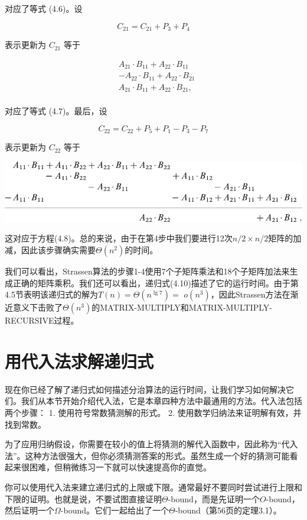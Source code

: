 \documentclass[lang=cn,newtx,10pt,scheme=chinese]{elegantbook}
\begin{document}
对应了等式 (4.6)。设

$$
C_{21}=C_{21}+P_3+P_4
$$

表示更新为 $C_{21}$ 等于

$$
\begin{aligned}
& A_{21} \cdot B_{11}+A_{22} \cdot B_{11} \\
& -A_{22} \cdot B_{11}+A_{22} \cdot B_{21} \\
& A_{21} \cdot B_{11}+A_{22} \cdot B_{21} \text {, } \\
&
\end{aligned}
$$

对应了等式 (4.7)。最后，设

$$
C_{22}=C_{22}+P_5+P_1-P_3-P_7
$$

表示更新为 $C_{22}$ 等于

\includegraphics{算法导论第四版插图/第四章/斯特拉森公式2.pdf}

这对应于方程(4.8)。总的来说，由于在第4步中我们要进行12次$n/2\times n/2$矩阵的加减，因此该步骤确实需要$\Theta\left(n^2\right)$的时间。

我们可以看出，Strassen算法的步骤1-4使用7个子矩阵乘法和18个子矩阵加法来生成正确的矩阵乘积。我们还可以看出，递归式(4.10)描述了它的运行时间。由于第4.5节表明该递归式的解为$T(n)=\Theta\left(n^{\lg 7}\right)=$ $o\left(n^3\right)$，因此Strassen方法在渐近意义下击败了$\Theta\left(n^3\right)$的MATRIX-MULTIPLY和MATRIX-MULTIPLY-RECURSIVE过程。


\section{用代入法求解递归式}

现在你已经了解了递归式如何描述分治算法的运行时间，让我们学习如何解决它们。我们从本节开始介绍代入法，它是本章四种方法中最通用的方法。代入法包括两个步骤：
1. 使用符号常数猜测解的形式。
2. 使用数学归纳法来证明解有效，并找到常数。

为了应用归纳假设，你需要在较小的值上将猜测的解代入函数中，因此称为“代入法”。这种方法很强大，但你必须猜测答案的形式。虽然生成一个好的猜测可能看起来很困难，但稍微练习一下就可以快速提高你的直觉。

你可以使用代入法来建立递归式的上限或下限。通常最好不要同时尝试进行上限和下限的证明。也就是说，不要试图直接证明$\Theta$-bound，而是先证明一个$O$-bound，然后证明一个$\Omega$-bound。它们一起给出了一个$\Theta$-bound（第56页的定理3.1）。
\end{document}
